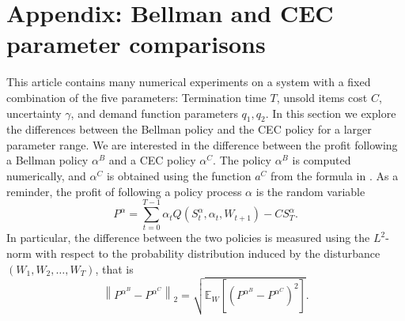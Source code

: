 \documentclass[main.tex]{subfiles}
\begin{document}
\listoftodos

\section*{Appendix: Bellman and CEC parameter comparisons}\label{sec:parameter_comparison}
This article contains many numerical experiments on a system
with a fixed combination of the five parameters:
Termination time $T$, unsold items cost $C$, uncertainty $\gamma$, and
demand function parameters $q_1,q_2$.
In this section we explore the differences between the Bellman policy
and the CEC policy for a larger parameter range.
We are interested in the difference between the profit following
a Bellman policy $\alpha^B$ and a CEC policy $\alpha^C$.
The policy $\alpha^B$ is computed numerically, and
$\alpha^C$ is obtained using the function $a^C$ from
the formula in .
As a reminder, the profit of following a policy process $\alpha$ is
the random variable
\begin{equation}
  P^\alpha = \sum_{t=0}^{T-1}\alpha_tQ(S_t^\alpha,\alpha_t,W_{t+1}) - CS_T^\alpha.
\end{equation}
In particular, the difference between the two policies is measured
using the $L^2$-norm with respect to the probability distribution
induced by the disturbance $(W_1,W_2,\dots,W_T)$, that is
\begin{equation}
  \left\|P^{\alpha^B}-P^{\alpha^C}\right\|_2
  =\sqrt{\mathbb E_W\left[{( P^{\alpha^B}-P^{\alpha^C} )}^2 \right]}.
\end{equation}
\end{document}
